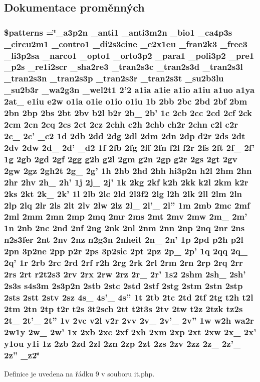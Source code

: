 \subsection{Dokumentace proměnných}
\hypertarget{it_8php_a99c668c59ad650ca9b31ad5313dc5720}{
\subsubsection[{\$patterns}]{\setlength{\rightskip}{0pt plus 5cm}\$patterns =\char`\"{}\-\_\-a3p2n \-\_\-anti1 \-\_\-anti3m2n \-\_\-bio1 \-\_\-ca4p3s \-\_\-circu2m1 \-\_\-contro1 \-\_\-di2s3cine \-\_\-e2x1eu \-\_\-fran2k3 \-\_\-free3 \-\_\-li3p2sa \-\_\-narco1 \-\_\-opto1 \-\_\-orto3p2 \-\_\-para1 \-\_\-poli3p2 \-\_\-pre1 \-\_\-p2s \-\_\-re1i2scr \-\_\-sha2re3 \-\_\-tran2s3c \-\_\-tran2s3d \-\_\-tran2s3l \-\_\-tran2s3n \-\_\-tran2s3p \-\_\-tran2s3r \-\_\-tran2s3t \-\_\-su2b3lu \-\_\-su2b3r \-\_\-wa2g3n \-\_\-wel2t1 2'2 a1ia a1ie a1io a1iu a1uo a1ya 2at\-\_\- e1iu e2w o1ia o1ie o1io o1iu 1b 2bb 2bc 2bd 2bf 2bm 2bn 2bp 2bs 2bt 2bv b2l b2r 2b\-\_\- 2b' 1c 2cb 2cc 2cd 2cf 2ck 2cm 2cn 2cq 2cs 2ct 2cz 2chh c2h 2chb ch2r 2chn c2l c2r 2c\-\_\- 2c' \-\_\-c2 1d 2db 2dd 2dg 2dl 2dm 2dn 2dp d2r 2ds 2dt 2dv 2dw 2d\-\_\- 2d' \-\_\-d2 1f 2fb 2fg 2ff 2fn f2l f2r 2fs 2ft 2f\-\_\- 2f' 1g 2gb 2gd 2gf 2gg g2h g2l 2gm g2n 2gp g2r 2gs 2gt 2gv 2gw 2gz 2gh2t 2g\-\_\- 2g' 1h 2hb 2hd 2hh hi3p2n h2l 2hm 2hn 2hr 2hv 2h\-\_\- 2h' 1j 2j\-\_\- 2j' 1k 2kg 2kf k2h 2kk k2l 2km k2r 2ks 2kt 2k\-\_\- 2k' 1l 2lb 2lc 2ld 2l3f2 2lg l2h 2lk 2ll 2lm 2ln 2lp 2lq 2lr 2ls 2lt 2lv 2lw 2lz 2l\-\_\- 2l'\-\_\- 2l'' 1m 2mb 2mc 2mf 2ml 2mm 2mn 2mp 2mq 2mr 2ms 2mt 2mv 2mw 2m\-\_\- 2m' 1n 2nb 2nc 2nd 2nf 2ng 2nk 2nl 2nm 2nn 2np 2nq 2nr 2ns n2s3fer 2nt 2nv 2nz n2g3n 2nheit 2n\-\_\- 2n' 1p 2pd p2h p2l 2pn 3p2ne 2pp p2r 2ps 3p2sic 2pt 2pz 2p\-\_\- 2p' 1q 2qq 2q\-\_\- 2q' 1r 2rb 2rc 2rd 2rf r2h 2rg 2rk 2rl 2rm 2rn 2rp 2rq 2rr 2rs 2rt r2t2s3 2rv 2rx 2rw 2rz 2r\-\_\- 2r' 1s2 2shm 2sh\-\_\- 2sh' 2s3s s4s3m 2s3p2n 2stb 2stc 2std 2stf 2stg 2stm 2stn 2stp 2sts 2stt 2stv 2sz 4s\-\_\- 4s'\-\_\- 4s'' 1t 2tb 2tc 2td 2tf 2tg t2h t2l 2tm 2tn 2tp t2r t2s 3t2sch 2tt t2t3s 2tv 2tw t2z 2tzk tz2s 2t\-\_\- 2t'\-\_\- 2t'' 1v 2vc v2l v2r 2vv 2v\-\_\- 2v'\-\_\- 2v'' 1w w2h wa2r 2w1y 2w\-\_\- 2w' 1x 2xb 2xc 2xf 2xh 2xm 2xp 2xt 2xw 2x\-\_\- 2x' y1ou y1i 1z 2zb 2zd 2zl 2zn 2zp 2zt 2zs 2zv 2zz 2z\-\_\- 2z'\-\_\- 2z'' \-\_\-z2\char`\"{}}}\label{it_8php_a99c668c59ad650ca9b31ad5313dc5720}


Definice je uvedena na řádku 9 v souboru it.\-php.

